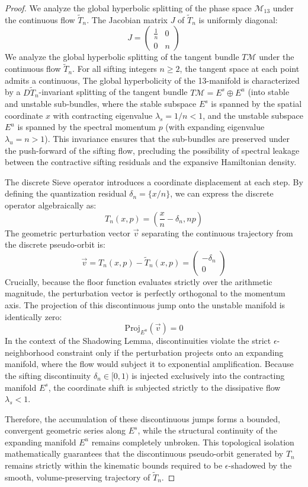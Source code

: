 \documentclass[sn-mathphys-num, pdflatex, referee]{sn-jnl}
\begin{document}
\begin{proof}
We analyze the global hyperbolic splitting of the phase space $\mathcal{M}_{13}$ under the continuous flow $\tilde{T}_n$. The Jacobian matrix $J$ of $\tilde{T}_n$ is uniformly diagonal:
$$ J = \begin{pmatrix} \frac{1}{n} & 0 \\ 0 & n \end{pmatrix} $$
We analyze the global hyperbolic splitting of the tangent bundle $T\mathcal{M}$ under the continuous flow $\tilde{T}_n$. For all sifting integers $n \ge 2$, the tangent space at each point admits a continuous, The global hyperbolicity of the 13-manifold is characterized by a $D\tilde{T}_n$-invariant splitting of the tangent bundle $T\mathcal{M} = E^s \oplus E^u$ (into stable and unstable sub-bundles, where the stable subspace $E^s$ is spanned by the spatial coordinate $x$ with contracting eigenvalue $\lambda_s = 1/n < 1$, and the unstable subspace $E^u$ is spanned by the spectral momentum $p$ (with expanding eigenvalue $\lambda_u = n > 1$). This invariance ensures that the sub-bundles are preserved under the push-forward of the sifting flow, precluding the possibility of spectral leakage between the contractive sifting residuals and the expansive Hamiltonian density.

The discrete Sieve operator introduces a coordinate displacement at each step. By defining the quantization residual $\delta_n = \{x/n\}$, we can express the discrete operator algebraically as:
$$ T_n(x,p) = \left( \frac{x}{n} - \delta_n, np \right) $$
The geometric perturbation vector $\vec{v}$ separating the continuous trajectory from the discrete pseudo-orbit is:
$$ \vec{v} = T_n(x,p) - \tilde{T}_n(x,p) = \begin{pmatrix} -\delta_n \\ 0 \end{pmatrix} $$
Crucially, because the floor function evaluates strictly over the arithmetic magnitude, the perturbation vector is perfectly orthogonal to the momentum axis. The projection of this discontinuous jump onto the unstable manifold is identically zero:
$$ \text{Proj}_{E^u}(\vec{v}) = 0 $$
In the context of the Shadowing Lemma, discontinuities violate the strict $\epsilon$-neighborhood constraint only if the perturbation projects onto an expanding manifold, where the flow would subject it to exponential amplification. Because the sifting discontinuity $\delta_n \in [0,1)$ is injected exclusively into the contracting manifold $E^s$, the coordinate shift is subjected strictly to the dissipative flow $\lambda_s < 1$. 

Therefore, the accumulation of these discontinuous jumps forms a bounded, convergent geometric series along $E^s$, while the structural continuity of the expanding manifold $E^u$ remains completely unbroken. This topological isolation mathematically guarantees that the discontinuous pseudo-orbit generated by $T_n$ remains strictly within the kinematic bounds required to be $\epsilon$-shadowed by the smooth, volume-preserving trajectory of $\tilde{T}_n$.
\end{proof}
\end{document}
